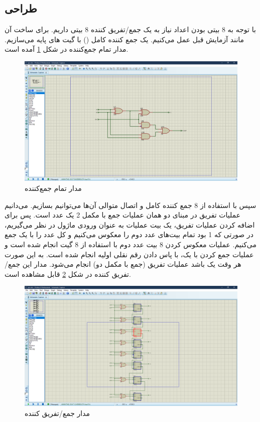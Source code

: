 \documentclass[fleqn]{article}
\begin{document}
\subsection{طراحی }

با توجه به 8 بیتی بودن اعداد نیاز به یک جمع/تفریق کننده 8 بیتی داریم. برای ساخت آن مانند آزمایش قبل عمل می‌کنیم.
یک جمع کننده کامل 
()
با گیت های پایه می‌سازیم. مدار تمام جمع‌کننده در شکل 
\ref{fa}
آمده است.

\begin{figure}[!htbp]
  \includegraphics[width=\textwidth]{Assets/fa.png}
  \caption{مدار تمام جمع‌کننده}
  \label{fa}
\end{figure}
 
سپس با استفاده از 8 جمع کننده کامل و اتصال متوالی آن‌ها می‌توانیم 
بسازیم. می‌دانیم عملیات تفریق در مبنای دو همان عملیات جمع با مکمل 2 یک عدد است. 
پس برای اضافه کردن عملیات تفریق، یک بیت عملیات به عنوان ورودی ماژول در نظر می‌گیریم، 
در صورتی که 1 بود تمام بیت‌های عدد دوم را معکوس می‌کنیم و کل عدد را با یک جمع می‌کنیم. 
عملیات معکوس کردن 8 بیت عدد دوم با استفاده از 8 گیت 
انجام شده است و عملیات جمع کردن با یک، با پاس دادن رقم نقلی اولیه انجام شده است. 
به این صورت هر وقت 
یک باشد عملیات تفریق (جمع با مکمل دو) انجام می‌شود. مدار این جمع/تفریق کننده در شکل 
\ref{as}
قابل مشاهده است. 

\begin{figure}[!htbp]
  \includegraphics[width=\textwidth]{Assets/as.png}
  \caption{مدار جمع‌/تفریق کننده}
  \label{as}
\end{figure}
\end{document}
